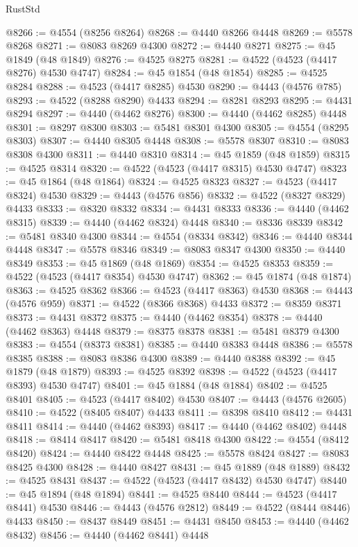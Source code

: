 \begin{lexlean}{RustStd}
\begin{coremodule}
@8266 := @4554 (@8256 @8264)
@8268 := @4440 @8266 @4448
@8269 := @5578 @8268
@8271 := @8083 @8269 @4300
@8272 := @4440 @8271
@8275 := @45 @1849 (@48 @1849)
@8276 := @4525 @8275
@8281 := @4522 (@4523 (@4417 @8276) @4530 @4747)
@8284 := @45 @1854 (@48 @1854)
@8285 := @4525 @8284
@8288 := @4523 (@4417 @8285) @4530
@8290 := @4443 (@4576 @785)
@8293 := @4522 (@8288 @8290) @4433
@8294 := @8281 @8293
@8295 := @4431 @8294
@8297 := @4440 (@4462 @8276)
@8300 := @4440 (@4462 @8285) @4448
@8301 := @8297 @8300
@8303 := @5481 @8301 @4300
@8305 := @4554 (@8295 @8303)
@8307 := @4440 @8305 @4448
@8308 := @5578 @8307
@8310 := @8083 @8308 @4300
@8311 := @4440 @8310
@8314 := @45 @1859 (@48 @1859)
@8315 := @4525 @8314
@8320 := @4522 (@4523 (@4417 @8315) @4530 @4747)
@8323 := @45 @1864 (@48 @1864)
@8324 := @4525 @8323
@8327 := @4523 (@4417 @8324) @4530
@8329 := @4443 (@4576 @856)
@8332 := @4522 (@8327 @8329) @4433
@8333 := @8320 @8332
@8334 := @4431 @8333
@8336 := @4440 (@4462 @8315)
@8339 := @4440 (@4462 @8324) @4448
@8340 := @8336 @8339
@8342 := @5481 @8340 @4300
@8344 := @4554 (@8334 @8342)
@8346 := @4440 @8344 @4448
@8347 := @5578 @8346
@8349 := @8083 @8347 @4300
@8350 := @4440 @8349
@8353 := @45 @1869 (@48 @1869)
@8354 := @4525 @8353
@8359 := @4522 (@4523 (@4417 @8354) @4530 @4747)
@8362 := @45 @1874 (@48 @1874)
@8363 := @4525 @8362
@8366 := @4523 (@4417 @8363) @4530
@8368 := @4443 (@4576 @959)
@8371 := @4522 (@8366 @8368) @4433
@8372 := @8359 @8371
@8373 := @4431 @8372
@8375 := @4440 (@4462 @8354)
@8378 := @4440 (@4462 @8363) @4448
@8379 := @8375 @8378
@8381 := @5481 @8379 @4300
@8383 := @4554 (@8373 @8381)
@8385 := @4440 @8383 @4448
@8386 := @5578 @8385
@8388 := @8083 @8386 @4300
@8389 := @4440 @8388
@8392 := @45 @1879 (@48 @1879)
@8393 := @4525 @8392
@8398 := @4522 (@4523 (@4417 @8393) @4530 @4747)
@8401 := @45 @1884 (@48 @1884)
@8402 := @4525 @8401
@8405 := @4523 (@4417 @8402) @4530
@8407 := @4443 (@4576 @2605)
@8410 := @4522 (@8405 @8407) @4433
@8411 := @8398 @8410
@8412 := @4431 @8411
@8414 := @4440 (@4462 @8393)
@8417 := @4440 (@4462 @8402) @4448
@8418 := @8414 @8417
@8420 := @5481 @8418 @4300
@8422 := @4554 (@8412 @8420)
@8424 := @4440 @8422 @4448
@8425 := @5578 @8424
@8427 := @8083 @8425 @4300
@8428 := @4440 @8427
@8431 := @45 @1889 (@48 @1889)
@8432 := @4525 @8431
@8437 := @4522 (@4523 (@4417 @8432) @4530 @4747)
@8440 := @45 @1894 (@48 @1894)
@8441 := @4525 @8440
@8444 := @4523 (@4417 @8441) @4530
@8446 := @4443 (@4576 @2812)
@8449 := @4522 (@8444 @8446) @4433
@8450 := @8437 @8449
@8451 := @4431 @8450
@8453 := @4440 (@4462 @8432)
@8456 := @4440 (@4462 @8441) @4448

\end{coremodule}
\end{lexlean}
